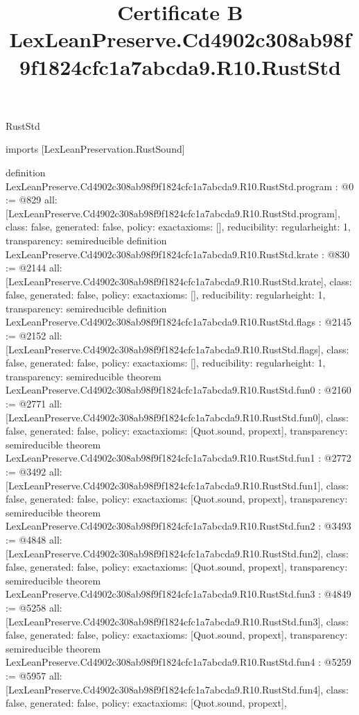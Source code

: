 \begin{lexlean}{RustStd}
\title{Certificate B LexLeanPreserve.Cd4902c308ab98f9f1824cfc1a7abcda9.R10.RustStd}
\begin{coremodule}
imports [LexLeanPreservation.RustSound]

definition LexLeanPreserve.Cd4902c308ab98f9f1824cfc1a7abcda9.R10.RustStd.program : @0 := @829 {
  all: [LexLeanPreserve.Cd4902c308ab98f9f1824cfc1a7abcda9.R10.RustStd.program],
  class: false,
  generated: false,
  policy: exact{axioms: []},
  reducibility: regular{height: 1},
  transparency: semireducible
}
definition LexLeanPreserve.Cd4902c308ab98f9f1824cfc1a7abcda9.R10.RustStd.krate : @830 := @2144 {
  all: [LexLeanPreserve.Cd4902c308ab98f9f1824cfc1a7abcda9.R10.RustStd.krate],
  class: false,
  generated: false,
  policy: exact{axioms: []},
  reducibility: regular{height: 1},
  transparency: semireducible
}
definition LexLeanPreserve.Cd4902c308ab98f9f1824cfc1a7abcda9.R10.RustStd.flags : @2145 := @2152 {
  all: [LexLeanPreserve.Cd4902c308ab98f9f1824cfc1a7abcda9.R10.RustStd.flags],
  class: false,
  generated: false,
  policy: exact{axioms: []},
  reducibility: regular{height: 1},
  transparency: semireducible
}
theorem LexLeanPreserve.Cd4902c308ab98f9f1824cfc1a7abcda9.R10.RustStd.fun0 : @2160 := @2771 {
  all: [LexLeanPreserve.Cd4902c308ab98f9f1824cfc1a7abcda9.R10.RustStd.fun0],
  class: false,
  generated: false,
  policy: exact{axioms: [Quot.sound, propext]},
  transparency: semireducible
}
theorem LexLeanPreserve.Cd4902c308ab98f9f1824cfc1a7abcda9.R10.RustStd.fun1 : @2772 := @3492 {
  all: [LexLeanPreserve.Cd4902c308ab98f9f1824cfc1a7abcda9.R10.RustStd.fun1],
  class: false,
  generated: false,
  policy: exact{axioms: [Quot.sound, propext]},
  transparency: semireducible
}
theorem LexLeanPreserve.Cd4902c308ab98f9f1824cfc1a7abcda9.R10.RustStd.fun2 : @3493 := @4848 {
  all: [LexLeanPreserve.Cd4902c308ab98f9f1824cfc1a7abcda9.R10.RustStd.fun2],
  class: false,
  generated: false,
  policy: exact{axioms: [Quot.sound, propext]},
  transparency: semireducible
}
theorem LexLeanPreserve.Cd4902c308ab98f9f1824cfc1a7abcda9.R10.RustStd.fun3 : @4849 := @5258 {
  all: [LexLeanPreserve.Cd4902c308ab98f9f1824cfc1a7abcda9.R10.RustStd.fun3],
  class: false,
  generated: false,
  policy: exact{axioms: [Quot.sound, propext]},
  transparency: semireducible
}
theorem LexLeanPreserve.Cd4902c308ab98f9f1824cfc1a7abcda9.R10.RustStd.fun4 : @5259 := @5957 {
  all: [LexLeanPreserve.Cd4902c308ab98f9f1824cfc1a7abcda9.R10.RustStd.fun4],
  class: false,
  generated: false,
  policy: exact{axioms: [Quot.sound, propext]},
}
\end{coremodule}
\end{lexlean}
